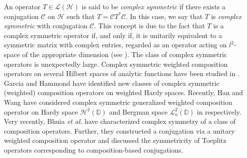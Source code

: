\documentclass[12pt, reqno]{amsart}
\theoremstyle{definition}
\theoremstyle{remark}
\numberwithin{equation}{section}
\begin{document}
     An operator $T\in \mathcal{L(H)}$ is said to be {\it complex symmetric} if there exists a conjugation $\mathcal{C}$ on $\mathcal{H}$ such that $T=\mathcal{C}T^*\mathcal{C}$. In this case, we say that $T$ is {\it complex symmetric} with conjugation $\mathcal{C}$. This concept is due to the fact that $T$ is a complex symmetric operator if, and only if, it is unitarily equivalent to a symmetric matrix with complex entries, regarded as an operator acting on $l^2$-space of the appropriate dimension (see \cite{Garcia_CM_2006}). The class of complex symmetric operators is unexpectedly large. Complex symmetric weighted composition operators on several Hilbert spaces of analytic functions have been studied in \cite{Jung_Kim_Ko_Lee_JFAA_2014, Lim_Khoi_JMAA_2018}. Garcia and Hammond \cite{Garcia_Hammond} have identified new classes of complex symmetric (weighted) composition operators on weighted Hardy spaces. Recently, Han and Wang have considered complex symmetric generalized weighted composition operator on Hardy space $\mathcal{H}^2(\mathbb{D})$ and Bergman space $\mathcal{L}_a^2(\mathbb{D})$ in \cite{Han_Wang_JMAA_2021,Han_Wang_CAOT_2021} respectively. Very recently, Bhuia {\it et al.} \cite{Bhuia_Pradhan_Sarkar_2025} have characterized complex symmetry of a class of composition operators. Further, they constructed a conjugation via a unitary weighted composition operator
and discussed the symmetricity of Toeplitz operators corresponding to composition-based conjugations.
	
	
\end{document}
